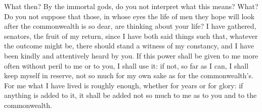  What then? By the immortal gods, do you not interpret what this means? What? Do you not suppose that those, in whose eyes the life of men they hope will look after the commonwealth is so dear, are thinking about your life? I have gathered, senators, the fruit of my return, since I have both said things such that, whatever the outcome might be, there should stand a witness of my constancy, and I have been kindly and attentively heard by you. If this power shall be given to me more often without peril to me or to you, I shall use it: if not, so far as I can, I shall keep myself in reserve, not so much for my own sake as for the commonwealth's. For me what I have lived is roughly enough, whether for years or for glory: if anything is added to it, it shall be added not so much to me as to you and to the commonwealth.
